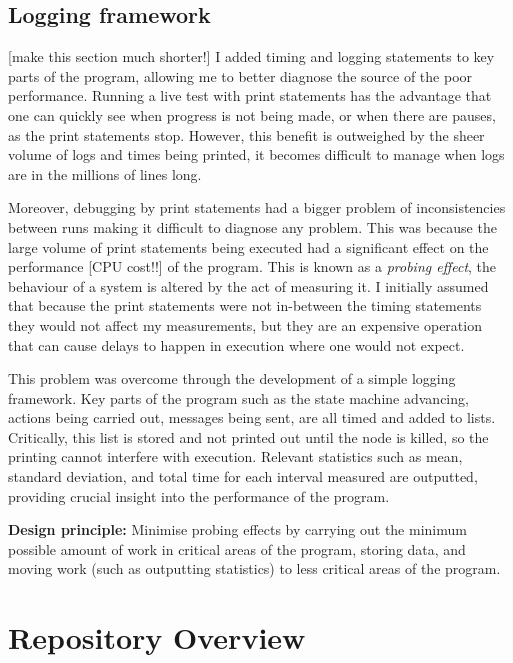 \subsection{Logging framework}
[make this section much shorter!]
I added timing and logging statements to key parts of the program, allowing me to better diagnose the source of the poor performance. Running a live test with print statements has the advantage that one can quickly see when progress is not being made, or when there are pauses, as the print statements stop. However, this benefit is outweighed by the sheer volume of logs and times being printed, it becomes difficult to manage when logs are in the millions of lines long.

Moreover, debugging by print statements had a bigger problem of inconsistencies between runs making it difficult to diagnose any problem. This was because the large volume of print statements being executed had a significant effect on the performance [CPU cost!!] of the program. This is known as a \textit{probing effect}, the behaviour of a system is altered by the act of measuring it. I initially assumed that because the print statements were not in-between the timing statements they would not affect my measurements, but they are an expensive operation that can cause delays to happen in execution where one would not expect.

This problem was overcome through the development of a simple logging framework. Key parts of the program such as the state machine advancing, actions being carried out, messages being sent, are all timed and added to lists. Critically, this list is stored and not printed out until the node is killed, so the printing cannot interfere with execution. Relevant statistics such as mean, standard deviation, and total time for each interval measured are outputted, providing crucial insight into the performance of the program.

\textbf{Design principle: } Minimise probing effects by carrying out the minimum possible amount of work in critical areas of the program, storing data, and moving work (such as outputting statistics) to less critical areas of the program.

\section{Repository Overview} \label{repo}

